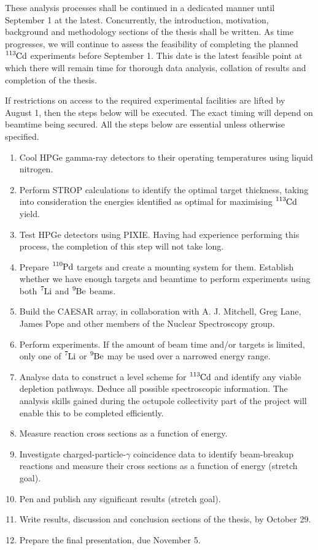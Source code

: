 \documentclass[12pt,a4paper]{article}
\begin{document}
\medskip
\noindent
These analysis processes shall be continued in a dedicated manner until September 1 at the latest.
Concurrently, the introduction, motivation, background and methodology sections of the thesis shall be written.
As time progresses, we will continue to assess the feasibility of completing the planned $\ce{^{113}Cd}$ experiments before September 1.
This date is the latest feasible point at which there will remain time for thorough data analysis, collation of results and completion of the thesis.

\medskip
\noindent
If restrictions on access to the required experimental facilities are lifted by August 1, then the steps below will be executed. The exact timing will depend on beamtime being secured. All the steps below are essential unless otherwise specified.
\begin{enumerate}
\item Cool HPGe gamma-ray detectors to their operating temperatures using liquid nitrogen.
\item Perform STROP calculations to identify the optimal target thickness, taking into consideration the energies identified as optimal for maximising $\ce{^{113}Cd}$ yield.
\item Test HPGe detectors using PIXIE. Having had experience performing this process, the completion of this step will not take long.
\item Prepare $\ce{^{110}Pd}$ targets and create a mounting system for them. Establish whether we have enough targets and beamtime to perform experiments using both $\ce{^{7}Li}$ and $\ce{^{9}Be}$ beams.
\item Build the CAESAR array, in collaboration with A. J. Mitchell, Greg Lane, James Pope and other members of the Nuclear Spectroscopy group.
\item Perform experiments.
If the amount of beam time and/or targets is limited, only one of $\ce{^{7}Li}$ or $\ce{^{9}Be}$ may be used over a narrowed energy range.
\item Analyse data to construct a level scheme for $\ce{^{113}Cd}$ and identify any viable depletion pathways.
Deduce all possible spectroscopic information.
The analysis skills gained during the octupole collectivity part of the project will enable this to be completed efficiently.
\item Measure reaction cross sections as a function of energy.
\item Investigate charged-particle-$\gamma$ coincidence data to identify beam-breakup reactions and measure their cross sections as a function of energy (stretch goal).
\item Pen and publish any significant results (stretch goal).
\item Write results, discussion and conclusion sections of the thesis, by October 29.
\item Prepare the final presentation, due November 5.
\end{enumerate}
\end{document}
